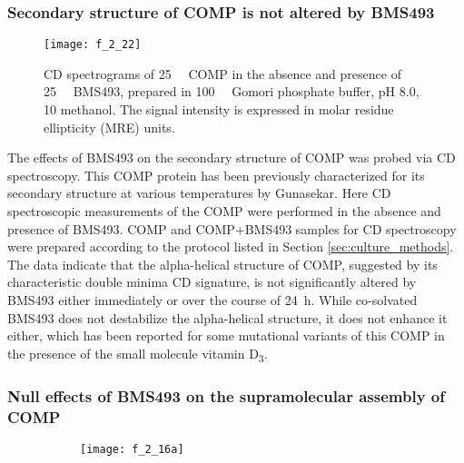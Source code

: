 \begin{refsection}
\subsubsection{Secondary structure of COMP is not altered by BMS493}
\label{sec:comp_cd}
\begin{figure}[h!] \centering \texttt{[image: f\_2\_22]}
    \caption{CD spectrograms of \SI{25}{\micro\moLar} COMP in the absence and
    presence of \SI{25}{\micro\moLar} BMS493, prepared in \SI{100}{\milli\moLar}
    Gomori phosphate buffer, pH 8.0, \SI{10}{\volper} methanol. The signal
    intensity is expressed in molar residue ellipticity (MRE)
units.}\label{fig:comp_cd} \end{figure}
The effects of BMS493 on the secondary structure of COMP was probed via CD
spectroscopy. This COMP protein has been previously characterized for its
secondary structure at various temperatures by Gunasekar.\cite{Gunasekar2009}
Here CD spectroscopic measurements of the COMP were performed in the absence and
presence of BMS493. COMP and COMP+BMS493 samples for CD spectroscopy were
prepared according to the protocol listed in Section \ref{sec:culture_methods}.
The data indicate that the alpha-helical structure of COMP, suggested by its
characteristic double minima CD signature, is not significantly altered by
BMS493 either immediately or over the course of \SI{24}{\hour}. While
co-solvated BMS493 does not destabilize the alpha-helical structure, it does not
enhance it either, which has been reported for some mutational variants of this
COMP in the presence of the small molecule vitamin
D\textsubscript{3}.\cite{Gunasekar2009}

\subsubsection{Null effects of BMS493 on the supramolecular assembly of COMP}
\begin{figure}[h!]
    \centering
    \begin{subfigure}[b]{0.5\textwidth}
        \texttt{[image: f\_2\_16a]}
        \caption{}
        \label{fig:zonal_elution_chrom}
    \end{subfigure}


\end{figure}
\end{refsection}
